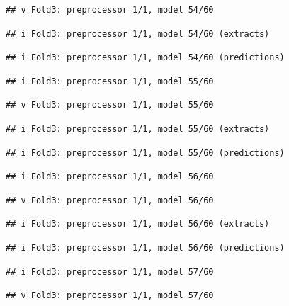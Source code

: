 \documentclass[
]{article}
\begin{document}
\begin{verbatim}
## v Fold3: preprocessor 1/1, model 54/60
\end{verbatim}

\begin{verbatim}
## i Fold3: preprocessor 1/1, model 54/60 (extracts)
\end{verbatim}

\begin{verbatim}
## i Fold3: preprocessor 1/1, model 54/60 (predictions)
\end{verbatim}

\begin{verbatim}
## i Fold3: preprocessor 1/1, model 55/60
\end{verbatim}

\begin{verbatim}
## v Fold3: preprocessor 1/1, model 55/60
\end{verbatim}

\begin{verbatim}
## i Fold3: preprocessor 1/1, model 55/60 (extracts)
\end{verbatim}

\begin{verbatim}
## i Fold3: preprocessor 1/1, model 55/60 (predictions)
\end{verbatim}

\begin{verbatim}
## i Fold3: preprocessor 1/1, model 56/60
\end{verbatim}

\begin{verbatim}
## v Fold3: preprocessor 1/1, model 56/60
\end{verbatim}

\begin{verbatim}
## i Fold3: preprocessor 1/1, model 56/60 (extracts)
\end{verbatim}

\begin{verbatim}
## i Fold3: preprocessor 1/1, model 56/60 (predictions)
\end{verbatim}

\begin{verbatim}
## i Fold3: preprocessor 1/1, model 57/60
\end{verbatim}

\begin{verbatim}
## v Fold3: preprocessor 1/1, model 57/60
\end{verbatim}
\end{document}
